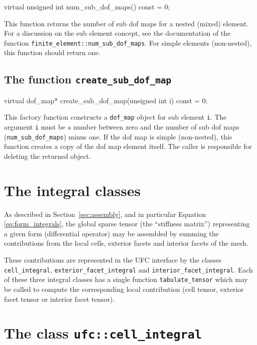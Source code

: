 \begin{code}
virtual unsigned int num_sub_dof_maps() const = 0;
\end{code}

This function returns the number of sub dof maps for a nested (mixed)
element. For a discussion on the sub element concept, see the
documentation of the function
\texttt{finite\_element::num\_sub\_dof\_maps}. For simple elements
(non-nested), this function should return one.

\subsection{The function \texttt{create\_sub\_dof\_map}}

\begin{code}
virtual dof_map* create_sub_dof_map(unsigned int i) const = 0;
\end{code}

This factory function constructs a \texttt{dof\_map} object for sub
element \texttt{i}. The argument \texttt{i} must be a number between
zero and the number of sub dof maps (\texttt{num\_sub\_dof\_maps})
minus one. If the dof map is simple (non-nested), this function
creates a copy of the dof map element itself.
The caller is responsible for deleting the returned object.

\section{The integral classes}

As described in Section~\ref{sec:assembly}, and in particular Equation
\eqref{eq:form_integrals}, the global sparse tensor
(the ``stiffness matrix'') representing a given form (differential
operator) may be assembled by summing the contributions from the local
cells, exterior facets and interior facets of the mesh.

These contributions are represented in the UFC interface by the
classes \texttt{cell\_integral}, \texttt{exterior\_facet\_integral}
and \texttt{interior\_facet\_integral}. Each of these three integral
classes has a single function \texttt{tabulate\_tensor} which may be
called to compute the corresponding local contribution (cell tensor,
exterior facet tensor or interior facet tensor).

\section{The class \texttt{ufc::cell\_integral}}

